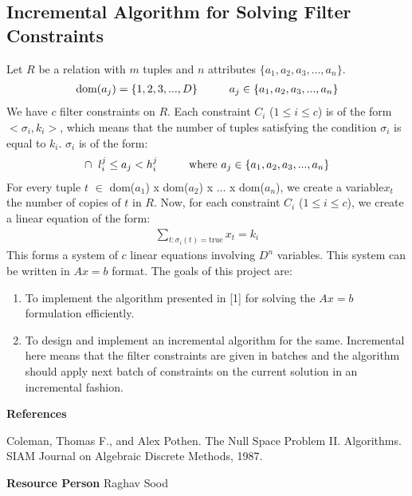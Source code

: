 \documentclass[]{article}
\begin{document}
\subsection*{Incremental Algorithm for Solving Filter Constraints}
Let $R$ be a relation with $m$ tuples and $n$ attributes $\{a_1, a_2, a_3, ... , a_n\}$.
\begin{align*}
\text{dom}(a_j) = \{1, 2, 3, ... , D\} \hspace{10 mm} a_j \in \{a_1, a_2, a_3, ... , a_n\}
\end{align*}
We have $c$ filter constraints on $R$. Each constraint $C_i$ ($1 \le i \le c$) is of the form $<\sigma_i, k_i>$, which means that the number of tuples satisfying the condition $\sigma_i$ is equal to $k_i$. $\sigma_i$ is of the form: 
\begin{align*}
\cap \hspace{2 mm} l_i^j \le a_j < h_i^j  \hspace{10 mm} \text{where } a_j \in \{a_1, a_2, a_3, ... , a_n\}
\end{align*}
For every tuple $t$ $\in$ dom($a_1$) x dom($a_2$) x ... x dom($a_n$), we create a variable$x_t$ the number of copies of $t$ in $R$. Now, for each constraint $C_i$ ($1 \le i \le c$), we create a linear equation of the form: 
\begin{align*}
\sum_{t:\sigma_i(t) = \text{true}} x_t = k_i
\end{align*}
This forms a system of $c$ linear equations involving $D^n$ variables. This system can be written in $Ax = b$ format. The goals of this project are:
\begin{enumerate}[\hspace{10 mm}(a)]
    \item To implement the algorithm presented in [1] for solving the $Ax = b$ formulation efficiently. 
    \item To design and implement an incremental algorithm for the same. Incremental here means that the filter constraints are given in batches and the algorithm should apply next batch of constraints on the current solution in an incremental fashion. 
\end{enumerate}

\textbf{References}
\begin{enumerate}[\hspace{10 mm}{[}1{]}]
	\item Coleman, Thomas F., and Alex Pothen. The Null Space Problem II. Algorithms. SIAM Journal on Algebraic Discrete Methods, 1987. 
\end{enumerate}

\textbf{Resource Person} \hspace{10 mm} Raghav Sood
\end{document}
